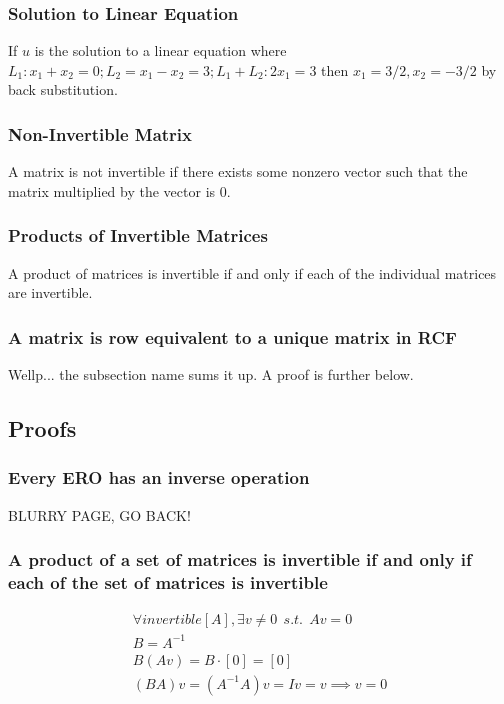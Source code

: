     \subsubsection{Solution to Linear Equation}
    
      If $u$ is the solution to a linear equation where $L_1: x_1 + x_2 = 0; L_2 = x_1 - x_2 = 3; L_1 + L_2: 2x_1 = 3$ then $x_1 = 3/2, x_2 = -3/2$ by back substitution.
      
    \subsubsection{Non-Invertible Matrix}

      A matrix is not invertible if there exists some nonzero vector such that the matrix multiplied by the vector is 0.

    \subsubsection{Products of Invertible Matrices}

      A product of matrices is invertible if and only if each of the individual matrices are invertible.

    \subsubsection{A matrix is row equivalent to a unique matrix in RCF}
      
      Wellp... the subsection name sums it up.
      A proof is further below.

  \subsection{Proofs}

    \subsubsection{Every ERO has an inverse operation}

      BLURRY PAGE, GO BACK!

    \subsubsection{A product of a set of matrices is invertible if and only if each of the set of matrices is invertible}

      \begin{align}
        \forall invertible[A], \exists v \neq 0\ \ s.t.\ \ Av = 0 \\
        B = A^{-1} \\
        B(Av) = B \cdot [0] = [0] \\
        (BA)v = (A^{-1}A)v = Iv = v \implies v = 0
      \end{align}

